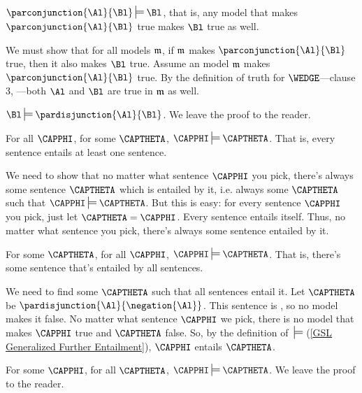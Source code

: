 \begin{majorILnc}{}
$\parconjunction{\Al}{\Bl}\sdtstile{}{}\Bl$, that is, any model that makes $\parconjunction{\Al}{\Bl}$ true makes $\Bl$ true as well. 
\end{majorILnc}
\begin{PROOF}
We must show that for all models $\mathfrak{m}$, if $\mathfrak{m}$ makes $\parconjunction{\Al}{\Bl}$ true, then it also makes $\Bl$ true. 
Assume an model $\mathfrak{m}$ makes $\parconjunction{\Al}{\Bl}$ true. 
By the definition of truth for $\WEDGE$---clause 3, ---both $\Al$ and $\Bl$ are true in $\mathfrak{m}$ as well. 
\end{PROOF}
\begin{majorILnc}{}
$\Bl\sdtstile{}{}\pardisjunction{\Al}{\Bl}$. We leave the proof to the reader.
\end{majorILnc}
\begin{majorILnc}{}
For all $\CAPPHI$, for some $\CAPTHETA$, $\CAPPHI\sdtstile{}{}\CAPTHETA$. That is, every \GSL{} sentence entails at least one \GSL{} sentence.
\end{majorILnc}
\begin{PROOF}
We need to show that no matter what \GSL{} sentence $\CAPPHI$ you pick, there's always some \GSL{} sentence $\CAPTHETA$ which is entailed by it, i.e. always some $\CAPTHETA$ such that $\CAPPHI\sdtstile{}{}\CAPTHETA$. 
But this is easy: for every \GSL{} sentence $\CAPPHI$ you pick, just let $\CAPTHETA=\CAPPHI$. 
Every \GSL{} sentence entails itself.  Thus, no matter what \GSL{} sentence you pick, there's always some sentence entailed by it. 
\end{PROOF}
\begin{majorILnc}{}
For some $\CAPTHETA$, for all $\CAPPHI$, $\CAPPHI\sdtstile{}{}\CAPTHETA$. That is, there's some \GSL{} sentence that's entailed by all \GSL{} sentences.
\end{majorILnc}
\begin{PROOF}
We need to find some $\CAPTHETA$ such that all \GSL{} sentences entail it. 
Let $\CAPTHETA$ be $\pardisjunction{\Al}{\negation{\Al}}$. 
This sentence is , so no model makes it false. 
No matter what sentence $\CAPPHI$ we pick, there is no model that makes $\CAPPHI$ true and $\CAPTHETA$ false. 
So, by the definition of $\:\sdtstile{}{}$ (\ref{GSL Generalized Further Entailment}), $\CAPPHI$ entails $\CAPTHETA$.
\end{PROOF}
\begin{majorILnc}{}
For some $\CAPPHI$, for all $\CAPTHETA$, $\CAPPHI\sdtstile{}{}\CAPTHETA$. We leave the proof to the reader.
\end{majorILnc}

